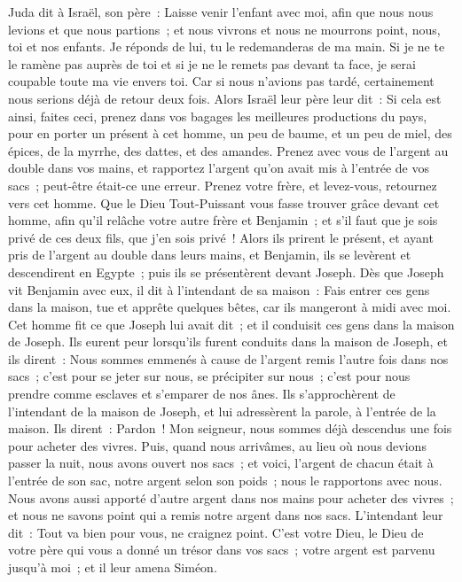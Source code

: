 \begin{multicols}{2}
Juda dit à Israël, son père~: Laisse venir l'enfant avec moi, afin que nous nous levions et que nous partions~; et nous vivrons et nous ne mourrons point, nous, toi et nos enfants.
Je réponds de lui, tu le redemanderas de ma main. Si je ne te le ramène pas auprès de toi et si je ne le remets pas devant ta face, je serai coupable toute ma vie envers toi.
Car si nous n'avions pas tardé, certainement nous serions déjà de retour deux fois.
Alors Israël leur père leur dit~: Si cela est ainsi, faites ceci, prenez dans vos bagages les meilleures productions du pays, pour en porter un présent à cet homme, un peu de baume, et un peu de miel, des épices, de la myrrhe, des dattes, et des amandes.
Prenez avec vous de l'argent au double dans vos mains, et rapportez l'argent qu'on avait mis à l'entrée de vos sacs~; peut-être était-ce une erreur.
Prenez votre frère, et levez-vous, retournez vers cet homme.
Que le Dieu Tout-Puissant vous fasse trouver grâce devant cet homme, afin qu'il relâche votre autre frère et Benjamin~; et s'il faut que je sois privé de ces deux fils, que j'en sois privé~!
Alors ils prirent le présent, et ayant pris de l'argent au double dans leurs mains, et Benjamin, ils se levèrent et descendirent en Egypte~; puis ils se présentèrent devant Joseph.
Dès que Joseph vit Benjamin avec eux, il dit à l'intendant de sa maison~: Fais entrer ces gens dans la maison, tue et apprête quelques bêtes, car ils mangeront à midi avec moi.
Cet homme fit ce que Joseph lui avait dit~; et il conduisit ces gens dans la maison de Joseph.
Ils eurent peur lorsqu'ils furent conduits dans la maison de Joseph, et ils dirent~: Nous sommes emmenés à cause de l'argent remis l'autre fois dans nos sacs~; c'est pour se jeter sur nous, se précipiter sur nous~; c'est pour nous prendre comme esclaves et s'emparer de nos ânes.
Ils s'approchèrent de l'intendant de la maison de Joseph, et lui adressèrent la parole, à l'entrée de la maison.
Ils dirent~: Pardon~! Mon seigneur, nous sommes déjà descendus une fois pour acheter des vivres.
Puis, quand nous arrivâmes, au lieu où nous devions passer la nuit, nous avons ouvert nos sacs~; et voici, l'argent de chacun était à l'entrée de son sac, notre argent selon son poids~; nous le rapportons avec nous.
Nous avons aussi apporté d'autre argent dans nos mains pour acheter des vivres~; et nous ne savons point qui a remis notre argent dans nos sacs.
L'intendant leur dit~: Tout va bien pour vous, ne craignez point. C'est votre Dieu, le Dieu de votre père qui vous a donné un trésor dans vos sacs~; votre argent est parvenu jusqu'à moi~; et il leur amena Siméon.

\end{multicols}
